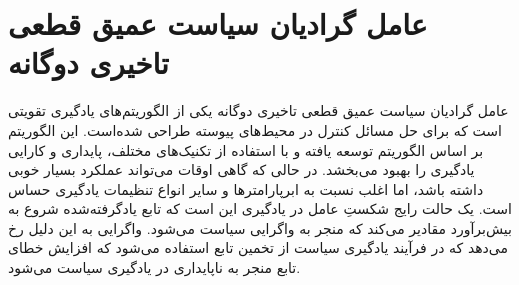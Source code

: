 \section{عامل گرادیان سیاست عمیق قطعی تاخیری دوگانه}\label{sec:TD3}
عامل گرادیان سیاست عمیق قطعی تاخیری دوگانه
 یکی از الگوریتم‌های یادگیری تقویتی است که برای حل مسائل کنترل در محیط‌های پیوسته طراحی شده‌است. این الگوریتم بر اساس الگوریتم  توسعه یافته و با استفاده از تکنیک‌های مختلف، پایداری و کارایی یادگیری را بهبود می‌بخشد.
 در حالی که  گاهی اوقات می‌تواند عملکرد بسیار خوبی داشته باشد، اما اغلب نسبت به ابرپارامترها و سایر انواع تنظیمات یادگیری حساس است.
  یک حالت رایج شکستِ عامل  در یادگیری این است که تابع  یادگرفته‌شده شروع به بیش‌برآورد مقادیر  می‌کند که منجر به واگرایی سیاست می‌شود. واگرایی به این دلیل رخ می‌دهد که در فرآیند یادگیری سیاست از تخمین تابع 
 استفاده می‌شود که افزایش خطای تابع  منجر به ناپایداری در یادگیری سیاست می‌شود.
 
